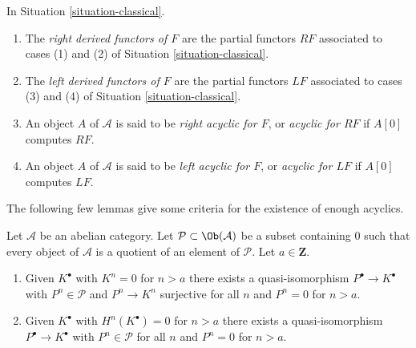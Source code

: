 \begin{definition}
\label{definition-derived-functor}
In
Situation \ref{situation-classical}.
\begin{enumerate}
\item The {\it right derived functors of $F$} are the partial functors
$RF$ associated to cases (1) and (2) of
Situation \ref{situation-classical}.
\item The {\it left derived functors of $F$} are the partial functors
$LF$ associated to cases (3) and (4) of
Situation \ref{situation-classical}.
\item An object $A$ of $\mathcal{A}$ is said to be
{\it right acyclic for $F$}, or {\it acyclic for $RF$}
if $A[0]$ computes $RF$.
\item An object $A$ of $\mathcal{A}$ is said to be
{\it left acyclic for $F$}, or {\it acyclic for $LF$}
if $A[0]$ computes $LF$.
\end{enumerate}
\end{definition}

\noindent
The following few lemmas give some criteria for the existence of
enough acyclics.

\begin{lemma}
\label{lemma-subcategory-left-resolution}
Let $\mathcal{A}$ be an abelian category. Let
$\mathcal{P} \subset \Ob(\mathcal{A})$ be a subset containing $0$
such that every object of $\mathcal{A}$ is a quotient of an element of
$\mathcal{P}$. Let $a \in \mathbf{Z}$.
\begin{enumerate}
\item Given $K^\bullet$ with $K^n = 0$ for $n > a$
there exists a quasi-isomorphism $P^\bullet \to K^\bullet$
with $P^n \in \mathcal{P}$ and $P^n \to K^n$ surjective
for all $n$ and $P^n = 0$ for $n > a$.
\item Given $K^\bullet$ with $H^n(K^\bullet) = 0$ for $n > a$
there exists a quasi-isomorphism $P^\bullet \to K^\bullet$
with $P^n \in \mathcal{P}$ for all $n$ and $P^n = 0$ for $n > a$.
\end{enumerate}
\end{lemma}

